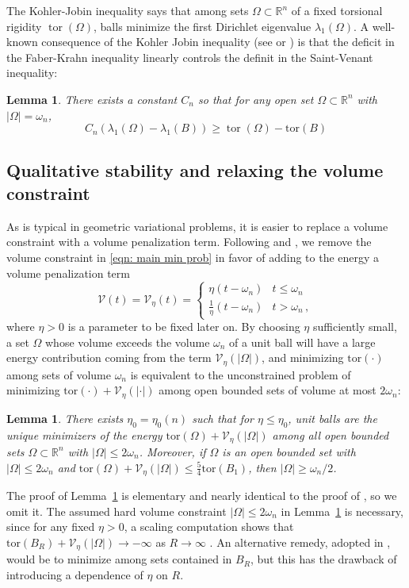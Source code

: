 \documentclass[10pt, reqno]{amsart}
\numberwithin{equation}{section}
\newtheorem{lemma}[theorem]{Lemma}
\def\R{{\mathbb R}}
\def\w{\omega}
\def\W{\Omega}
\def\om{\omega}
\def\tor{\mathrm{tor}}
\def\vpar{\eta}
\def\fv{\mathscr{V}_{\vpar}}
\begin{document}
The Kohler-Jobin inequality \cite{KJ1, KJ2, KJ3}
says that among sets $\Omega \subset \mathbb{R}^n$ of a fixed torsional rigidity $\operatorname{tor}(\Omega)$, balls minimize the first Dirichlet eigenvalue $\lambda_1(\Omega)$. 
A well-known consequence of the Kohler Jobin inequality (see \cite[Cor. 3.18]{AKN1} or \cite[Prop. 2.1]{BDV15}) is that the deficit in the Faber-Krahn inequality linearly controls the definit in the Saint-Venant inequality:
\begin{lemma}\label{lem: KJ consequence}
 There exists a constant $C_n$ so that for any open set $\W\subset \R^n$ with $|\W|=\om_n$, 
\[
C_n\left(\lambda_1(\Omega)-\lambda_1(B)\right) \geq \operatorname{tor}(\Omega)-\tor(B)
\]
\end{lemma}


%
%
\subsection{Qualitative stability and relaxing the volume constraint}\label{ssec: qual stab}
As is typical in geometric variational problems, it is easier to replace a volume constraint with a volume penalization term. 
Following \cite{aac86} and \cite{BDV15}, we remove the volume constraint in \eqref{eqn: main min prob} in favor of adding to the energy a volume penalization term
\begin{equation} \label{eqn: def vol penalization fixed param}
	\mathscr{V}(t)=\fv(t) = \begin{cases}
		\vpar (t - \om_n) & t \leq \om_n\\
		\frac{1}{\vpar}(t - \om_n) & t > \om_n\,,
	\end{cases}
\end{equation}
where $\vpar>0$ is a parameter to be fixed later on.
By choosing  $\vpar$ sufficiently small, a set $\W$ whose volume exceeds the volume $\om_n$ of a unit ball will have a large energy contribution coming from the term $\fv(|\W|)$, and minimizing $\tor(\cdot)$ among sets of volume $\w_n$ is equivalent to the unconstrained problem of minimizing $\tor(\cdot)  + \fv(|\cdot|)$ among open bounded sets of volume at most $2\omega_n$:
\begin{lemma}
    \label{prop: base summary}
 There exists $\vpar_0 = \vpar_0(n)$ such that for $\vpar \leq \vpar_0$,  unit balls are the unique minimizers of the energy $\tor(\W)  + \fv(|\W|)$ among all open bounded sets $ \W \subset \R^n$ with $|\W | \leq 2 \omega_n$.
 Moreover, if $\W$ is an open bounded set with $|\W | \leq 2 \omega_n$ and  $\tor(\W)  + \fv(|\W|) \leq \frac{5}{4}\tor(B_1)$, then $|\W| \geq \omega_n/2$.
\end{lemma} 
The proof of Lemma~\ref{prop: base summary} is elementary and nearly identical to the proof of \cite[Lemma 4.5]{BDV15}, so we omit it.
%
The assumed hard volume constraint $|\W| \leq2 \om_n$ in Lemma~\ref{prop: base summary} is necessary, since for any fixed $\eta >0$,  a scaling computation shows that  $\tor(B_R) + \fv(|\W|) \to -\infty$ as $R \to \infty$ .  An alternative remedy, adopted in \cite{BDV15}, would be to minimize among sets contained in $B_R$, but this has the drawback of introducing a dependence of $\eta$ on $R$.
 
\end{document}
